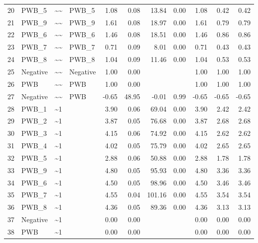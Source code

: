 \documentclass{article}
\begin{document}
\begin{table}[ht]
\begin{tabular}{rlllrrrrrrr}
  20 & PWB\_5 & \~{}\~{} & PWB\_5 & 1.08 & 0.08 & 13.84 & 0.00 & 1.08 & 0.42 & 0.42 \\ 
  21 & PWB\_9 & \~{}\~{} & PWB\_9 & 1.61 & 0.08 & 18.97 & 0.00 & 1.61 & 0.79 & 0.79 \\ 
  22 & PWB\_6 & \~{}\~{} & PWB\_6 & 1.46 & 0.08 & 18.51 & 0.00 & 1.46 & 0.86 & 0.86 \\ 
  23 & PWB\_7 & \~{}\~{} & PWB\_7 & 0.71 & 0.09 & 8.01 & 0.00 & 0.71 & 0.43 & 0.43 \\ 
  24 & PWB\_8 & \~{}\~{} & PWB\_8 & 1.04 & 0.09 & 11.46 & 0.00 & 1.04 & 0.53 & 0.53 \\ 
  25 & Negative & \~{}\~{} & Negative & 1.00 & 0.00 &  &  & 1.00 & 1.00 & 1.00 \\ 
  26 & PWB & \~{}\~{} & PWB & 1.00 & 0.00 &  &  & 1.00 & 1.00 & 1.00 \\ 
  27 & Negative & \~{}\~{} & PWB & -0.65 & 48.95 & -0.01 & 0.99 & -0.65 & -0.65 & -0.65 \\ 
  28 & PWB\_1 & \~{}1 &  & 3.90 & 0.06 & 69.04 & 0.00 & 3.90 & 2.42 & 2.42 \\ 
  29 & PWB\_2 & \~{}1 &  & 3.87 & 0.05 & 76.68 & 0.00 & 3.87 & 2.68 & 2.68 \\ 
  30 & PWB\_3 & \~{}1 &  & 4.15 & 0.06 & 74.92 & 0.00 & 4.15 & 2.62 & 2.62 \\ 
  31 & PWB\_4 & \~{}1 &  & 4.02 & 0.05 & 75.79 & 0.00 & 4.02 & 2.65 & 2.65 \\ 
  32 & PWB\_5 & \~{}1 &  & 2.88 & 0.06 & 50.88 & 0.00 & 2.88 & 1.78 & 1.78 \\ 
  33 & PWB\_9 & \~{}1 &  & 4.80 & 0.05 & 95.93 & 0.00 & 4.80 & 3.36 & 3.36 \\ 
  34 & PWB\_6 & \~{}1 &  & 4.50 & 0.05 & 98.96 & 0.00 & 4.50 & 3.46 & 3.46 \\ 
  35 & PWB\_7 & \~{}1 &  & 4.55 & 0.04 & 101.16 & 0.00 & 4.55 & 3.54 & 3.54 \\ 
  36 & PWB\_8 & \~{}1 &  & 4.36 & 0.05 & 89.36 & 0.00 & 4.36 & 3.13 & 3.13 \\ 
  37 & Negative & \~{}1 &  & 0.00 & 0.00 &  &  & 0.00 & 0.00 & 0.00 \\ 
  38 & PWB & \~{}1 &  & 0.00 & 0.00 &  &  & 0.00 & 0.00 & 0.00 \\ 
   \hline
\end{tabular}
\end{table}
\end{document}
